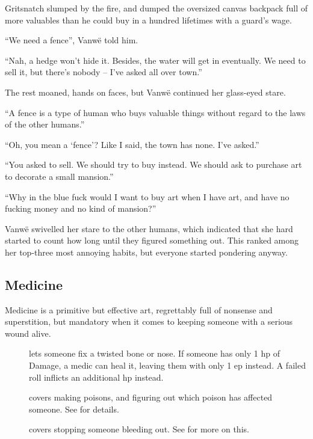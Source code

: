 \begin{multicols}{2}
\begin{exampletext}
  Gritsnatch slumped by the fire, and dumped the oversized canvas backpack full of more valuables than he could buy in a hundred lifetimes with a \gls{guard}'s wage.

  ``We need a fence'', Vanw\"e told him.

  ``Nah, a hedge won't hide it.
  Besides, the water will get in eventually.
  We need to sell it, but there's nobody -- I've asked all over town.''

  The rest moaned, hands on faces, but Vanw\"e continued her glass-eyed stare.

  ``A fence is a type of human who buys valuable things without regard to the laws of the other humans.''

  ``Oh, you mean a `fence'?
  Like I said, the town has none.
  I've asked.''

  ``You asked to sell.
  We should try to buy instead.
  We should ask to purchase art to decorate a small mansion.''

  ``Why in the blue fuck would I want to buy art when I have art, and have no fucking money and no kind of mansion?''

  Vanw\"e swivelled her stare to the other humans, which indicated that she hard started to count how long until they figured something out.
  This ranked among her top-three most annoying habits, but everyone started pondering anyway.
\end{exampletext}

\subsection{Medicine}

Medicine is a primitive but effective art, regrettably full of nonsense and superstition, but mandatory when it comes to keeping someone with a serious wound alive.

\begin{description}
  \item[]
    lets someone fix a twisted bone or nose.
    If someone has only 1 \gls{hp} of Damage, a medic can heal it, leaving them with only 1 \gls{ep} instead.
    A failed roll inflicts an additional \gls{hp} instead.
  \item[]
    covers making poisons, and figuring out which poison has affected someone.
    See  for details.
  \item[]
    covers stopping someone bleeding out.
    See  for more on this.
\end{description}


\end{multicols}
